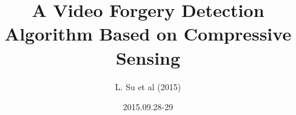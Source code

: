 

\title[A Video Forgery Detection Algorithm Based on Compressive Sensing]
{A Video Forgery Detection Algorithm Based on Compressive Sensing}
\author[L. Su et al (2015)]
{L. Su et al (2015)}
\date{2015.09.28-29}














